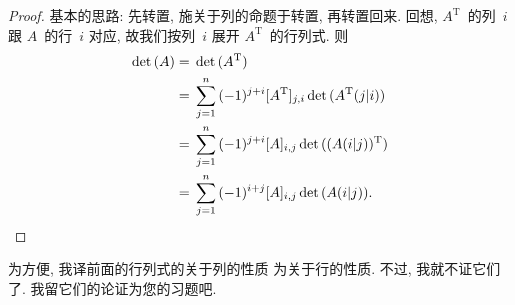 \begin{proof}
    基本的思路:
    先转置,
    施关于列的命题于转置,
    再转置回来.
    回想,
    \(A^{\mathrm{T}}\)~的列~\(i\)
    跟 \(A\)~的行~\(i\) 对应,
    故我们按列~\(i\) 展开 \(A^{\mathrm{T}}\)~的行列式.
    则
    \begin{align*}
        \det {(A)}
        = {} & \det {(A^{\mathrm{T}})}
        \\
        = {} & \sum_{j = 1}^{n}
        {(-1)^{j+i} [A^{\mathrm{T}}]_{j,i}
        \det {(A^{\mathrm{T}}(j|i))}
        }
        \\
        = {} & \sum_{j = 1}^{n}
        {(-1)^{j+i} [A]_{i,j}
        \det {((A(i|j))^{\mathrm{T}})}
        }
        \\
        = {} & \sum_{j = 1}^{n}
        {(-1)^{i+j} [A]_{i,j}
        \det {(A(i|j))}
        }.
        \qedhere
    \end{align*}
\end{proof}

为方便,
我译前面的行列式的关于列的性质%
为关于行的性质.
不过, 我就不证它们了.
我留它们的论证为您的习题吧.

